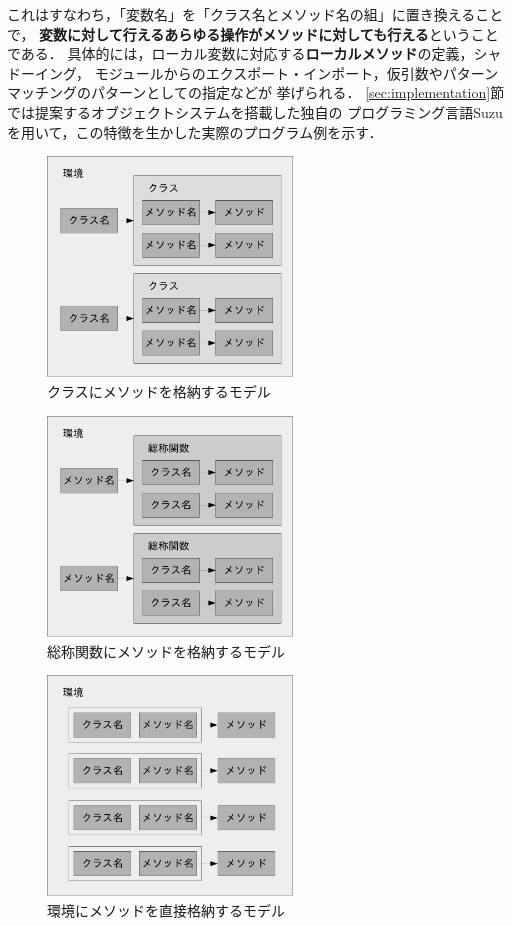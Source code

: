 \documentclass{ipsjprosym}
\begin{document}
これはすなわち，「変数名」を「クラス名とメソッド名の組」に置き換えることで，
\textbf{変数に対して行えるあらゆる操作がメソッドに対しても行える}ということである．
具体的には，ローカル変数に対応する\textbf{ローカルメソッド}の定義，シャドーイング，
モジュールからのエクスポート・インポート，仮引数やパターンマッチングのパターンとしての指定などが
挙げられる．
\ref{sec:implementation}節では提案するオブジェクトシステムを搭載した独自の
プログラミング言語Suzuを用いて，この特徴を生かした実際のプログラム例を示す．

\begin{figure}
\centering
\includegraphics[width=6.5cm]{fig/classes-crop.pdf}
\caption{クラスにメソッドを格納するモデル}
\label{fig:classes}
\end{figure}

\begin{figure}
\centering
\includegraphics[width=6.5cm]{fig/generic-functions-crop.pdf}
\caption{総称関数にメソッドを格納するモデル}
\label{fig:generic-functions}
\end{figure}

\begin{figure}
\centering
\includegraphics[width=6.5cm]{fig/environment-crop.pdf}
\caption{環境にメソッドを直接格納するモデル}
\label{fig:environment}
\end{figure}
\end{document}

